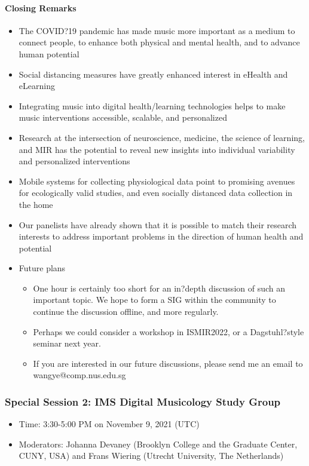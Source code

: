 \documentclass[%
10pt,								%
]
{scrartcl}
\begin{document}
        \paragraph{Closing Remarks}
        \begin{itemize}
            \item   The COVID?19 pandemic has made music more important as a medium to connect people, to enhance both physical and mental health, and to advance human potential
            \item   Social distancing measures have greatly enhanced interest in eHealth and eLearning
            \item   Integrating music into digital health/learning technologies helps to make music interventions accessible, scalable, and personalized
            \item   Research at the intersection of neuroscience, medicine, the science of learning, and MIR has the potential to reveal new insights into individual variability and personalized interventions
            \item   Mobile systems for collecting physiological data point to promising avenues for ecologically valid studies, and even socially distanced data collection in the home
            \item   Our panelists have already shown that it is possible to match their research interests to address important problems in the direction of human health and potential
            \item   Future plans
                \begin{itemize}
                    \item   One hour is certainly too short for an in?depth discussion of such an important topic. We hope to form a SIG within the community to continue the discussion offline, and more regularly.
                    \item   Perhaps we could consider a workshop in ISMIR2022, or a Dagstuhl?style seminar next year.
                    \item   If you are interested in our future discussions, please send me an email to wangye@comp.nus.edu.sg

                \end{itemize}
        \end{itemize}
        
 
        \subsubsection{Special Session 2: IMS Digital Musicology Study Group}
        \begin{itemize}
            \item   Time: 3:30-5:00 PM on November 9, 2021 (UTC)

            \item   Moderators: Johanna Devaney (Brooklyn College and the Graduate Center, CUNY, USA) and Frans Wiering (Utrecht University, The Netherlands)
        \end{itemize}
\end{document}
